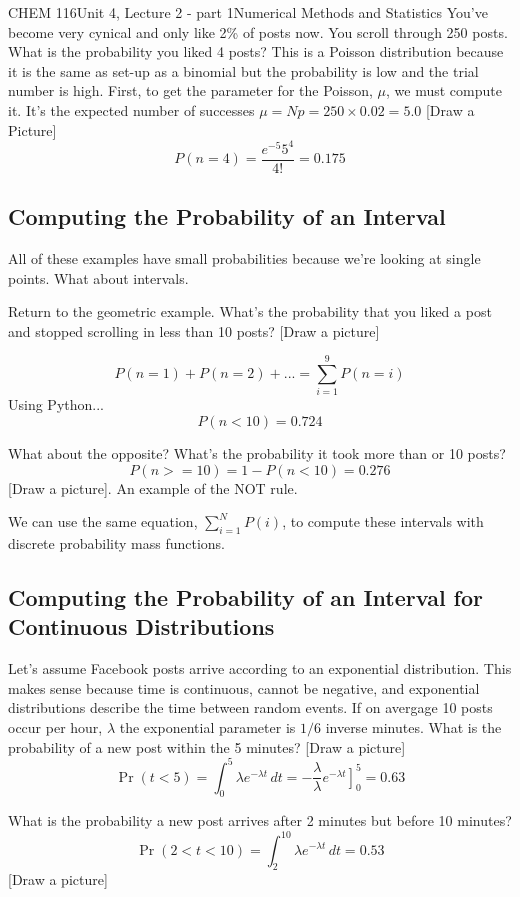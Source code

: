 \documentclass{article}
\begin{document}
\begin{tdoc}{CHEM 116}{Unit 4, Lecture 2 - part 1}{Numerical Methods and Statistics}
 You've become very cynical and only like 2\% of posts now. You scroll
 through 250 posts. What is the probability you liked 4 posts? This is
 a Poisson distribution because it is the same as set-up as a binomial
 but the probability is low and the trial number is high. First, to
 get the parameter for the Poisson, $\mu$, we must compute it. It's
 the expected number of successes $\mu = Np = 250 \times 0.02 = 5.0$
 [Draw a Picture]
 \[
 P(n=4) = \frac{e^{-5}5^4}{4!} = 0.175
 \]

 \subsection{Computing the Probability of an Interval}

 All of these examples have small probabilities because we're looking
 at single points. What about intervals.

Return to the geometric example. What's the probability that you liked
a post and stopped scrolling in less than 10 posts? [Draw a picture]

\[
P(n = 1) + P(n = 2) + ... = \sum_{i=1}^{9} P(n = i)
\]
Using Python...
\[
P(n < 10) = 0.724
\]

What about the opposite? What's the probability it took more than or
10 posts?
\[
P(n >= 10) = 1 - P(n < 10) = 0.276
\]
[Draw a picture]. An example of the NOT rule.

We can use the same equation, $\sum_{i=1}^N P(i)$, to compute these
intervals with discrete probability mass functions.

\subsection{Computing the Probability of an Interval for Continuous Distributions}

Let's assume Facebook posts arrive according to an exponential
distribution. This makes sense because time is continuous, cannot be
negative, and exponential distributions describe the time between
random events. If on avergage 10 posts occur per hour, $\lambda$ the
exponential parameter is $1/6$ inverse minutes. What is the probability of a
new post within the 5 minutes? [Draw a picture]
\[
\Pr(t < 5) = \int_0^{5} \lambda e^{-\lambda t}\,dt = -\frac{\lambda}{\lambda}\left.e^{-\lambda t}\right]_0^{5} = 0.63
\]

What is the probability a new post arrives after 2 minutes but before 10 minutes?
\[
\Pr(2 < t < 10) = \int_{2}^{10} \lambda e^{-\lambda t}\,dt  = 0.53
\] 
[Draw a picture]


\end{tdoc}
\end{document}
